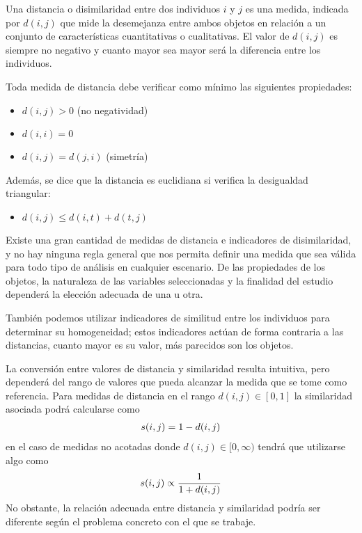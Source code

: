\documentclass[a4paper,12pt,spanish]{book}
\begin{document}
Una distancia o disimilaridad entre dos individuos \(i\) y \(j\) es una medida,
indicada por \(d(i,j)\) que mide la desemejanza entre ambos objetos en relación a un
conjunto de características cuantitativas o cualitativas. El valor de \(d(i,j)\) es
siempre no negativo y cuanto mayor sea mayor será la diferencia entre los individuos.

Toda medida de distancia debe verificar como mínimo las siguientes propiedades:
\begin{itemize}
\item {} 
\(d(i,j)>0\) (no negatividad)

\item {} 
\(d(i,i)=0\)

\item {} 
\(d(i,j)=d(j,i)\) (simetría)

\end{itemize}

Además, se dice que la distancia es euclidiana si verifica la desigualdad triangular:
\begin{itemize}
\item {} 
\(d(i,j) \leq d(i,t)+d(t,j)\)

\end{itemize}

Existe una gran cantidad de medidas de distancia e indicadores de disimilaridad, y no hay
ninguna regla general que nos permita definir una medida que sea válida para todo tipo de
análisis en cualquier escenario. De las propiedades de los objetos, la naturaleza de las
variables seleccionadas y la finalidad del estudio dependerá la elección adecuada de una u
otra.

También podemos utilizar indicadores de similitud entre los individuos para determinar su
homogeneidad; estos indicadores actúan de forma contraria a las distancias, cuanto mayor
es su valor, más parecidos son los objetos.

La conversión entre valores de distancia y similaridad resulta intuitiva, pero dependerá
del rango de valores que pueda alcanzar la medida que se tome como referencia. Para medidas
de distancia en el rango \(d(i,j) \in [0, 1]\) la similaridad asociada podrá calcularse como
\begin{gather}
\begin{split}s(i,j) = 1-d(i,j)\end{split}\notag
\end{gather}
en el caso de medidas no acotadas donde \(d(i,j) \in [0, \infty)\)
tendrá que utilizarse algo como
\begin{gather}
\begin{split}s(i,j) \propto \frac{1}{1 + d(i,j)}\end{split}\notag
\end{gather}
No obstante, la relación adecuada entre distancia y similaridad podría ser diferente según el
problema concreto con el que se trabaje.
\end{document}
